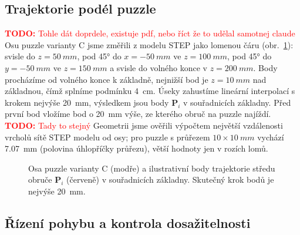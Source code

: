\documentclass[11pt,a4paper]{article}
\newcommand{\todo}[1]{\textcolor{red}{\textbf{TODO:} #1}}
\begin{document}
\subsection{Trajektorie podél puzzle}
\label{sec:trajektorie}

\todo{Tohle dát doprdele, existuje pdf, nebo říct že to udělal samotnej claude}
Osu puzzle varianty C jsme změřili z modelu STEP \cite{rob1hw} jako lomenou
čáru (obr.~\ref{fig:puzzle_c}): svisle do $z = \SI{50}{mm}$, pod \ang{45} do
$x = \SI{-50}{mm}$ ve $z = \SI{100}{mm}$, pod \ang{45} do $y = \SI{-50}{mm}$ ve
$z = \SI{150}{mm}$ a svisle do volného konce v $z = \SI{200}{mm}$. Body
procházíme od volného konce k základně, nejnižší bod je
$z = \SI{10}{mm}$ nad základnou, čímž splníme podmínku \SI{4}{cm}.
Úseky zahustíme lineární interpolací s krokem nejvýše \SI{20}{mm}, výsledkem
jsou body $\mathbf{P}_i$ v souřadnicích základny. Před první bod vložíme bod
o \SI{20}{mm} výše, ze kterého obruč na puzzle najíždí.
\todo{Tady to stejný}
Geometrii jsme ověřili výpočtem největší vzdálenosti vrcholů sítě STEP modelu
od osy; pro puzzle s průřezem $10\times\SI{10}{mm}$ vychází \SI{7,07}{mm} (polovina
úhlopříčky průřezu), větší hodnoty jen v rozích lomů.

\begin{figure}[H]
  \centering
  \caption{Osa puzzle varianty C (modře) a ilustrativní body trajektorie středu obruče
  $\mathbf{P}_i$ (červeně) v souřadnicích základny. Skutečný krok bodů je nejvýše \SI{20}{mm}.}
  \label{fig:puzzle_c}
\end{figure}

\subsection{Řízení pohybu a kontrola dosažitelnosti}
\label{sec:rizeni}
\end{document}
